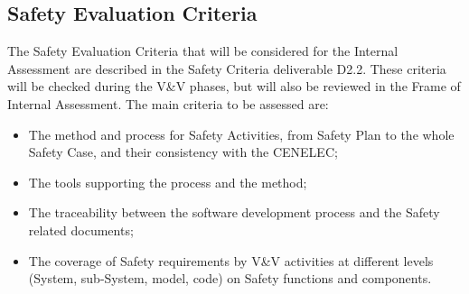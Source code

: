 \documentclass[openetcs]{template/openetcs_article}
\begin{document}
\subsection{Safety Evaluation Criteria}
The Safety Evaluation Criteria that will be considered for the Internal Assessment are described in the Safety Criteria deliverable D2.2. These criteria will be
checked during the V\&V phases, but will also be reviewed in the Frame of Internal Assessment.
The main criteria to be assessed are:
\begin{itemize}
\item The method and process for Safety Activities, from Safety Plan to the whole Safety Case, and their consistency with the CENELEC;
\item The tools supporting the process and the method;
\item The traceability between the software development process and the Safety related documents;
\item The coverage of Safety requirements by V\&V activities at different levels (System,  sub-System, model, code) on Safety functions and components.
\end{itemize}
\end{document}
